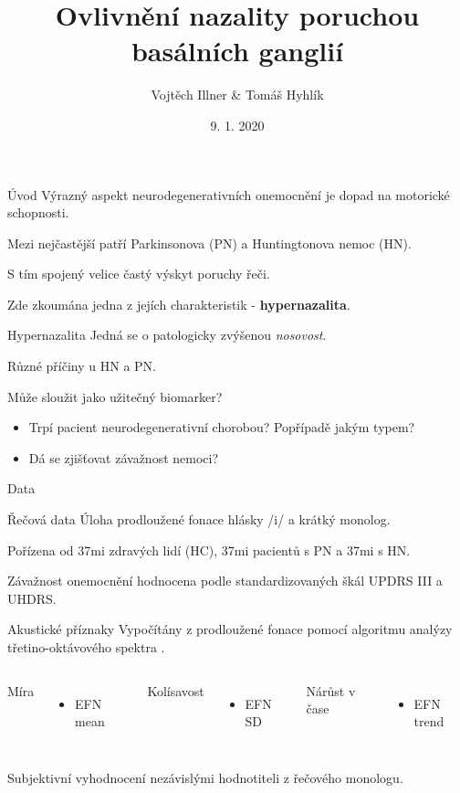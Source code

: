 \documentclass{beamer}
\title{Ovlivnění nazality poruchou basálních ganglií}
\date{9. 1. 2020}
\author{Vojtěch Illner \& Tomáš Hyhlík}
\institute{Semestrální projekt B2M31AEDA, 2019/20}
\begin{document}
  \maketitle

  \begin{frame}{Úvod}
    Výrazný aspekt neurodegenerativních onemocnění je dopad na motorické schopnosti.
    
    Mezi nejčastější patří Parkinsonova (PN) a Huntingtonova nemoc (HN).
    
    S tím spojený velice častý výskyt poruchy řeči.
    
    Zde zkoumána jedna z jejích charakteristik - \textbf{hypernazalita}.
    
  \end{frame}

  \begin{frame}{Hypernazalita}
	Jedná se o patologicky zvýšenou \emph{nosovost}.
	
	Různé příčiny u HN a PN.
	
	Může sloužit jako užitečný biomarker? 
	\begin{itemize}
		\item Trpí pacient neurodegenerativní chorobou? Popřípadě jakým typem?
		\item Dá se zjišťovat závažnost nemoci? 
	\end{itemize}
  \end{frame}

  \begin{frame}{Data}
  	\begin{alertblock}{Řečová data}
  		Úloha prodloužené fonace hlásky /i/ a krátký monolog.
  		
  		Pořízena od 37mi zdravých lidí (HC), 37mi pacientů s PN a 37mi s HN.
  		
  		Závažnost onemocnění hodnocena podle standardizovaných škál UPDRS III a UHDRS.
  	\end{alertblock}
    \begin{alertblock}{Akustické příznaky}
    	Vypočítány z prodloužené fonace pomocí algoritmu analýzy třetino-oktávového spektra \cite{algorithm}.
    	\begin{columns}[T,onlytextwidth]
    		Míra
    		\begin{itemize}
    			\item EFN mean
    		\end{itemize}
    		
    		Kolísavost
    		\begin{itemize}
    			\item EFN SD
    		\end{itemize}
    		
    		Nárůst v čase
    		\begin{itemize}
    			\item EFN trend
    		\end{itemize}
    	\end{columns}
    Subjektivní vyhodnocení nezávislými hodnotiteli z řečového monologu.
    \end{alertblock}
  \end{frame}
\end{document}
